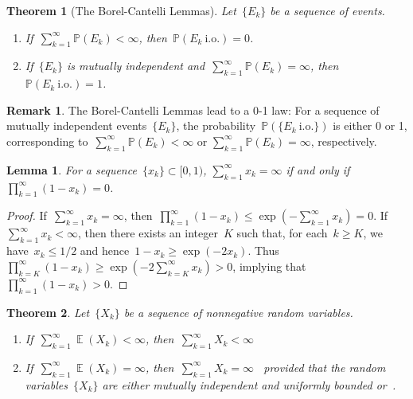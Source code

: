 \documentclass[12pt,a4paper]{article}  %
\newtheorem{theorem}{Theorem}[section]
\newtheorem{lemma}{Lemma}[section]
\theoremstyle{definition}
\newtheorem{remark}{Remark}[section]
\numberwithin{equation}{section}
\newcommand{\io}{{\text{i.o.}}\xspace}
\newcommand{\as}{{\text{a.s.}}\xspace}
\newcommand{\iid}{{\text{i.i.d.}}\xspace}
\DeclareMathOperator{\expc}{\mathbb{E}}
\renewcommand{\Pr}{\mathbb{P}}
\begin{document}
\begin{theorem}[The Borel-Cantelli Lemmas]
    \label{th:bc}
    Let~$\{E_k\}$ be a sequence of events.
    \begin{enumerate}
        \item If~$\sum_{k=1}^\infty \Pr(E_k) < \infty$, then~$\Pr(E_k~\io) = 0$.
        \item If~$\{E_k\}$ is mutually independent and~$\sum_{k=1}^\infty \Pr(E_k)
            = \infty$, then~$\Pr(E_k~\io) = 1$.
    \end{enumerate}
\end{theorem}

\begin{remark}
    \label{rem:01}
    The Borel-Cantelli Lemmas lead to a 0-1 law: For a sequence of mutually independent
    events~$\{E_k\}$, the probability~$\Pr(\{E_k~\io\})$ is either 0 or 1, corresponding
    to~$\sum_{k=1}^\infty \Pr(E_k) < \infty$ or $\sum_{k=1}^\infty \Pr(E_k) = \infty$, respectively.
\end{remark}

\begin{lemma}
    \label{lem:sumprod}
    For a sequence~$\{x_k\} \subset [0,1)$, $\sum_{k=1}^\infty x_k = \infty$ if and only if
     $\prod_{k=1}^\infty (1-x_k) = 0$.
\end{lemma}
\begin{proof}
    If~$\sum_{k=1}^\infty x_k = \infty$, then~$\prod_{k=1}^\infty (1-x_k)\le \exp(-\sum_{k=1}^\infty
    x_k) = 0$. If~$\sum_{k=1}^\infty x_k < \infty$, then there exists an integer~$K$ such
    that, for each~$k\ge K$, we have~$x_k \le 1/2$ and hence~$1-x_k \ge \exp(-2x_k)$. Thus
    $\prod_{k=K}^\infty (1-x_k) \ge \exp(-2\sum_{k=K}^\infty x_k) > 0$, implying that~$\prod_{k=1}^\infty
    (1-x_k) > 0$.
\end{proof}

\begin{theorem}
    \label{th:inf}
    Let~$\{X_k\}$ be a sequence of nonnegative random variables.
    \begin{enumerate}
        \item If~$\sum_{k=1}^\infty\expc(X_k) < \infty$, then~$\sum_{k=1}^\infty X_k < \infty$~\as
        \item If~$\sum_{k=1}^\infty\expc(X_k)= \infty$, then~$\sum_{k=1}^\infty X_k = \infty$~\as
            provided that the random variables~$\{X_k\}$ are
            either mutually independent and uniformly bounded or~\iid.
    \end{enumerate}
\end{theorem}
\end{document}
